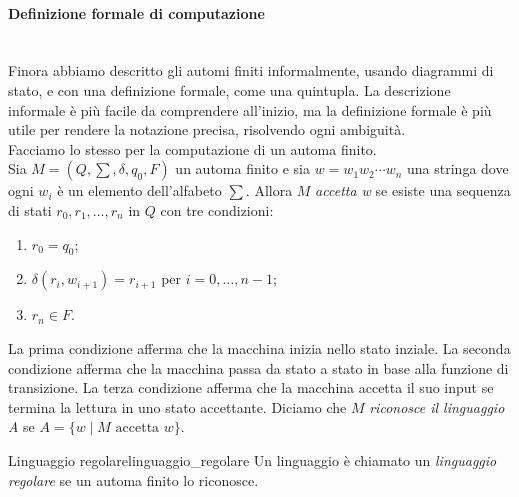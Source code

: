 \documentclass[12pt]{report}
\newcounter{definition}
\newcommand{\nmu}{}
\begin{document}
	\paragraph{Definizione formale di computazione} \quad \\
	Finora abbiamo descritto gli automi finiti informalmente, usando diagrammi di stato, e con una definizione formale, come una quintupla. La descrizione informale è più facile da comprendere all'inizio, ma la definizione formale è più utile per rendere la notazione precisa, risolvendo ogni ambiguità. \\
	Facciamo lo stesso per la computazione di un automa finito. \\
	Sia $M = (Q, \sum, \delta, q_0, F)$ un automa finito e sia $w = w_1w_2\cdots w_n$ una stringa dove ogni $w_i$ è un elemento dell'alfabeto $\sum$. Allora $M$ \textit{accetta w} se esiste una sequenza di stati $r_0, r_1, \dots, r_n$ in $Q$ con tre condizioni:
	\begin{enumerate}
		\item $r_0 = q_0$;
		\item $\delta(r_i, w_{i+1}) = r_{i+1}$ per $i = 0, \dots, n - 1$;
		\item $r_n \in F$.
	\end{enumerate}
	La prima condizione afferma che la macchina inizia nello stato inziale. La seconda condizione afferma che la macchina passa da stato a stato in base alla funzione di transizione. La terza condizione afferma che la macchina accetta il suo input se termina la lettura in uno stato accettante. Diciamo che $M$ \textit{riconosce il linguaggio A} se $A = \{w \mid M \text{ accetta } w\}$.
	\begin{definition}{\nmu Linguaggio regolare}{linguaggio_regolare}
		Un linguaggio è chiamato un \textit{linguaggio regolare} se un automa finito lo riconosce.
	\end{definition}
\end{document}
